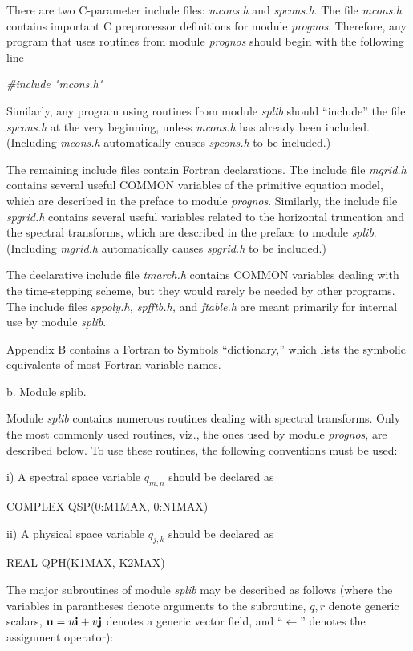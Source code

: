 There are two C-parameter include files: {\it mcons.h} and {\it spcons.h}.
The file {\it mcons.h} contains important C preprocessor definitions for
module {\it prognos}. Therefore, any program that uses routines from module
{\it prognos} should begin with the following line---
 
{\sl \#include "mcons.h"}
 
Similarly, any program using routines from module {\it splib} should
``include'' the file {\it spcons.h} at the very beginning, unless {\it
mcons.h} has already been included. (Including {\it mcons.h} automatically
causes {\it spcons.h} to be included.)
 
The remaining include files contain Fortran declarations. The include file
{\it mgrid.h} contains several useful COMMON variables of the primitive
equation model, which are described in the preface to module {\it prognos}.
Similarly, the include file {\it spgrid.h} contains several useful variables
related to the horizontal truncation and the spectral transforms, which are
described in the preface to module {\it splib}. (Including {\it mgrid.h}
automatically causes {\it spgrid.h} to be included.)
 
The declarative include file {\it tmarch.h} contains COMMON variables dealing
with the time-stepping scheme, but they would rarely be needed by other
programs. The include files {\it sppoly.h, spfftb.h,} and {\it ftable.h} are
meant primarily for internal use by module {\it splib}.
 
Appendix B contains a Fortran to Symbols ``dictionary,'' which lists the
symbolic equivalents of most Fortran variable names.
 
\Subsection b. Module {\rm splib}.
 
Module {\it splib} contains numerous routines dealing with spectral
transforms. Only the most commonly used routines, viz., the ones used by
module {\it prognos}, are described below.  To use these routines, the
following conventions must be used:
 
\item{i)} A spectral space variable $q_{m,n}$ should be declared as
 
COMPLEX QSP(0:M1MAX, 0:N1MAX)
 
\item{ii)} A physical space variable $q_{j,k}$ should be declared as
 
REAL QPH(K1MAX, K2MAX)
 
 
The major subroutines of module {\it splib} may be described as follows (where
the variables in parantheses denote arguments to the subroutine, $q, r$ denote
generic scalars, ${{\bf u}} = u{{\bf i}} + v{{\bf j}}$ denotes a generic vector field,
and ``$\gets$'' denotes the assignment operator):
 
